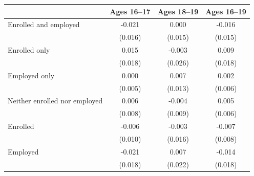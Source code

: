 \begin{tabular}{lccc}
\toprule
 & Ages 16--17 & Ages 18--19 & Ages 16--19 \\
\midrule
Enrolled and employed & -0.021 & 0.000 & -0.016 \\
 & (0.016) & (0.015) & (0.015) \\
Enrolled only & 0.015 & -0.003 & 0.009 \\
 & (0.018) & (0.026) & (0.018) \\
Employed only & 0.000 & 0.007 & 0.002 \\
 & (0.005) & (0.013) & (0.006) \\
Neither enrolled nor employed & 0.006 & -0.004 & 0.005 \\
 & (0.008) & (0.009) & (0.006) \\
Enrolled & -0.006 & -0.003 & -0.007 \\
 & (0.010) & (0.016) & (0.008) \\
Employed & -0.021 & 0.007 & -0.014 \\
 & (0.018) & (0.022) & (0.018) \\
\bottomrule
\end{tabular}
